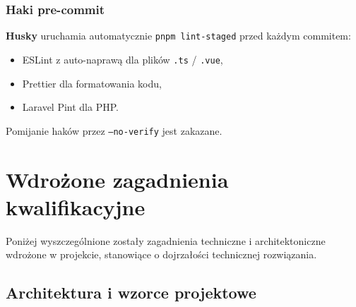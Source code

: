 \documentclass[12pt,a4paper]{report}
\begin{document}
\subsection{Haki pre-commit}

\textbf{Husky} uruchamia automatycznie \texttt{pnpm lint-staged} przed każdym commitem:
\begin{itemize}[noitemsep]
    \item ESLint z auto-naprawą dla plików \texttt{.ts} / \texttt{.vue},
    \item Prettier dla formatowania kodu,
    \item Laravel Pint dla PHP.
\end{itemize}
Pomijanie haków przez \texttt{--no-verify} jest zakazane.


\chapter{Wdrożone zagadnienia kwalifikacyjne}
\label{ch:zagadnienia}

Poniżej wyszczególnione zostały zagadnienia techniczne i architektoniczne wdrożone w projekcie, stanowiące o dojrzałości technicznej rozwiązania.

\section{Architektura i wzorce projektowe}
\end{document}
